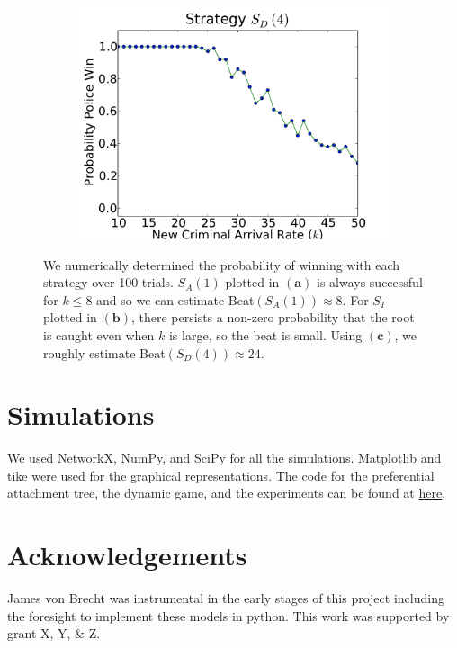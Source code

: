 \documentclass[11pt]{article}
\renewcommand{\b}[1]{\mathbf{#1}}
\theoremstyle{plain}
\theoremstyle{definition}
\begin{document}
\begin{figure}
\begin{subfigure}[b]{0.3\textwidth}
\includegraphics[width=\textwidth]{ImprovedPlotS3.pdf}
\caption{}
  \end{subfigure}

 \caption{We numerically determined the probability of winning with each strategy over 100 trials.  $S_A(1)$ plotted in $\b{(a)}$ is always successful for $k \leq 8$ and so we can estimate Beat$(S_A(1)) \approx 8$.  For $S_I$ plotted in $\b{(b)}$, there persists a non-zero probability that the root is caught even when $k$ is large, so the beat is small. Using $\b{(c)}$, we roughly estimate Beat$(S_D(4)) \approx 24$.}
 \label{beats}
 \end{figure}
 
 
 \section*{Simulations}
 
 We used NetworkX, NumPy, and SciPy for all the simulations.  Matplotlib and tike were used for the graphical representations.  The code for the preferential attachment tree, the dynamic game, and the experiments can be found at \url{here}.
 
\section*{Acknowledgements}
James von Brecht was instrumental in the early stages of this project including the foresight to implement these models in python.  This work was supported by grant X, Y, \& Z.






\end{document}
